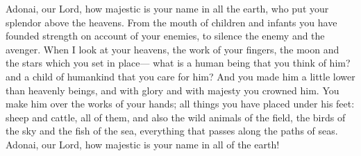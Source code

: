 \begin{biblechapter} %
 Adonai, our Lord, how majestic is your name in all the earth, 
who put your splendor above the heavens.
\verse From the mouth of children and infants you have founded strength 
on account of your enemies, 
to silence the enemy and the avenger.
\verse When I look at your heavens, the work of your fingers, 
the moon and the stars which you set in place—
\verse what is a human being that you think of him? 
and a child of humankind that you care for him?
\verse And you made him a little lower than heavenly beings, 
and with glory and with majesty you crowned him.
\verse You make him over the works of your hands; 
all things you have placed under his feet:
\verse sheep and cattle, all of them, 
and also the wild animals of the field,
\verse the birds of the sky and the fish of the sea, 
everything that passes along the paths of seas.
\verse Adonai, our Lord, 
how majestic is your name in all of the earth!
\end{biblechapter}


